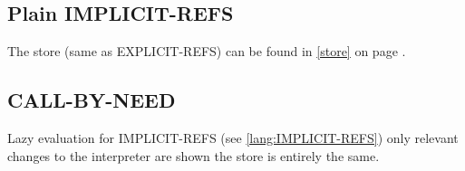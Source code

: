 \documentclass[../codeprint.tex]{subfiles}
\begin{document}
\subsection{Plain IMPLICIT-REFS}
\label{lang:IMPLICIT-REFS}
The store (same as EXPLICIT-REFS) can be found in \autoref{store} on page \pageref{store}.



\subsection{CALL-BY-NEED}
Lazy evaluation for IMPLICIT-REFS (see \autoref{lang:IMPLICIT-REFS}) only relevant changes to the interpreter are shown the store is entirely the same.

\end{document}
